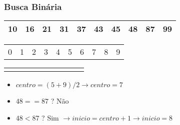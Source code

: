 \documentclass{beamer}
\begin{document}
\begin{frame}
    \frametitle{Busca Binária}
    \begin{center}
        \begin{table}
            \begin{tabular}{| p{0.25cm} | p{0.25cm} | p{0.25cm} | p{0.25cm} | p{0.25cm} | p{0.25cm} | p{0.25cm} | p{0.25cm} | p{0.25cm} | p{0.25cm} |}
                \hline
                10 & 16 & 21 & 31 & 37 & 43 & 45 & 48 & 87 & 99 \\ \hline
            \end{tabular}
            \begin{tabular}{p{0.25cm} p{0.25cm} p{0.25cm} p{0.25cm} p{0.25cm} p{0.25cm} p{0.25cm} p{0.25cm} p{0.25cm} p{0.25cm}}
                0 & 1 & 2 & 3 & 4 & 5 & 6 & 7 & 8 & 9
            \end{tabular}
            \begin{tabular}{p{0.25cm} p{0.25cm} p{0.25cm} p{0.25cm} p{0.25cm} p{0.25cm} p{0.25cm} p{0.25cm} p{0.25cm} p{0.25cm}}
                & & & & \color{blue}{$\uparrow$} & & & \color{red}{$\uparrow$} & &
            \end{tabular}
        \end{table}
	\end{center}
    \begin{itemize}[<+->]
        \item $centro = (5 + 9) / 2 \rightarrow centro = 7$
        \item $48 == 87$ ? Não
        \item $48 < 87$ ? Sim $\rightarrow inicio = centro + 1 \rightarrow inicio = 8$
    \end{itemize}
\end{frame}
\end{document}
